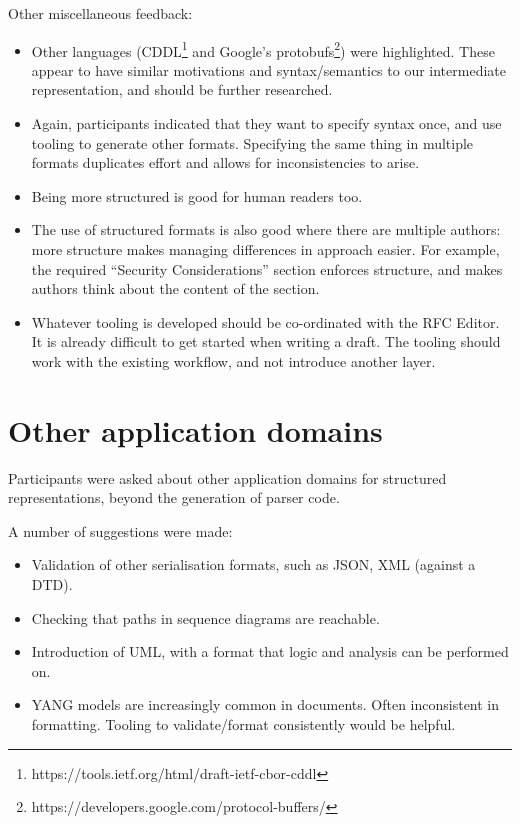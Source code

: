 \documentclass[10pt]{article}
\begin{document}
Other miscellaneous feedback:
\begin{itemize}
	\item Other languages (CDDL\footnote{https://tools.ietf.org/html/draft-ietf-cbor-cddl}
	      and Google's protobufs\footnote{https://developers.google.com/protocol-buffers/})
	      were highlighted. These appear to have similar motivations and syntax/semantics
	      to our intermediate representation, and should be further researched.
	\item Again, participants indicated that they want to specify syntax once, and use
	      tooling to generate other formats. Specifying the same thing in multiple formats
	      duplicates effort and allows for inconsistencies to arise.
	\item Being more structured is good for human readers too.
	\item The use of structured formats is also good where there are multiple authors:
	      more structure makes managing differences in approach easier. For example, the
	      required ``Security Considerations'' section enforces structure, and makes
	      authors think about the content of the section.
	\item Whatever tooling is developed should be co-ordinated with the RFC Editor. It is
	      already difficult to get started when writing a draft. The tooling should work
	      with the existing workflow, and not introduce another layer.
\end{itemize}

\section{Other application domains}

Participants were asked about other application domains for structured representations,
beyond the generation of parser code.

A number of suggestions were made:
\begin{itemize}
	\item Validation of other serialisation formats, such as JSON, XML (against a DTD).
	\item Checking that paths in sequence diagrams are reachable.
	\item Introduction of UML, with a format that logic and analysis can be performed on.
	\item YANG models are increasingly common in documents. Often inconsistent in
		  formatting. Tooling to validate/format consistently would be helpful.
\end{itemize}
\end{document}
